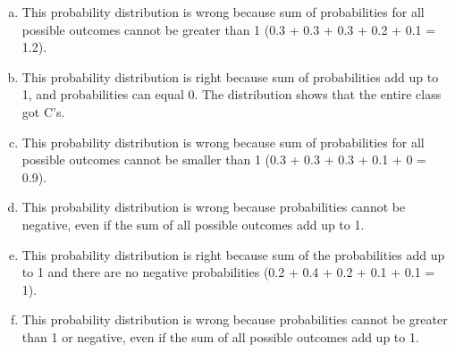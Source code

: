 
{
\begin{enumerate}[(a)]
\item This probability distribution is wrong because sum of probabilities for all possible outcomes cannot be greater than 1 (0.3 + 0.3 + 0.3 + 0.2 + 0.1 = 1.2).
\item This probability distribution is right because sum of probabilities add up to 1, and probabilities can equal 0. The distribution shows that the entire class got C's.
\item This probability distribution is wrong because sum of probabilities for all possible outcomes cannot be smaller than 1 (0.3 + 0.3 + 0.3 + 0.1 + 0 = 0.9).
\item This probability distribution is wrong because probabilities cannot be negative, even if the sum of all possible outcomes add up to 1.
\item This probability distribution is right because sum of the probabilities add up to 1 and there are no negative probabilities (0.2 + 0.4 + 0.2 + 0.1 + 0.1 = 1).
\item This probability distribution is wrong because probabilities cannot be greater than 1 or negative, even if the sum of all possible outcomes add up to 1.
\end{enumerate}
}


